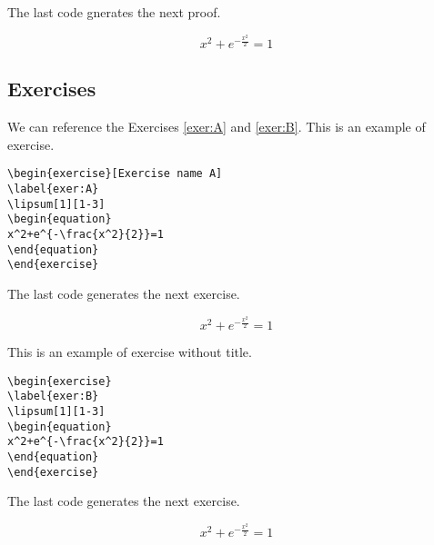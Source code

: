 The last code gnerates the next proof.
\begin{proofraw}
\lipsum[1][1-3]
\begin{equation}
x^2+e^{-\frac{x^2}{2}}=1
\end{equation}
\end{proofraw}

\subsection{Exercises}


We can reference the Exercises \ref{exer:A} and \ref{exer:B}.
This is an example of exercise.
\begin{highlightbox}
\begin{verbatim}
\begin{exercise}[Exercise name A]
\label{exer:A}
\lipsum[1][1-3]
\begin{equation}
x^2+e^{-\frac{x^2}{2}}=1
\end{equation}
\end{exercise}
\end{verbatim}
\end{highlightbox}

The last code generates the next exercise.
\begin{exercise}
\label{exer:A}
\lipsum[1][1-3]
\begin{equation}
x^2+e^{-\frac{x^2}{2}}=1
\end{equation}
\end{exercise}

This is an example of exercise without title.
\begin{highlightbox}
\begin{verbatim}
\begin{exercise}
\label{exer:B}
\lipsum[1][1-3]
\begin{equation}
x^2+e^{-\frac{x^2}{2}}=1
\end{equation}
\end{exercise}
\end{verbatim}
\end{highlightbox}

The last code generates the next exercise.
\begin{exercise}
\label{exer:B}
\lipsum[1][1-3]
\begin{equation}
x^2+e^{-\frac{x^2}{2}}=1
\end{equation}
\end{exercise}


